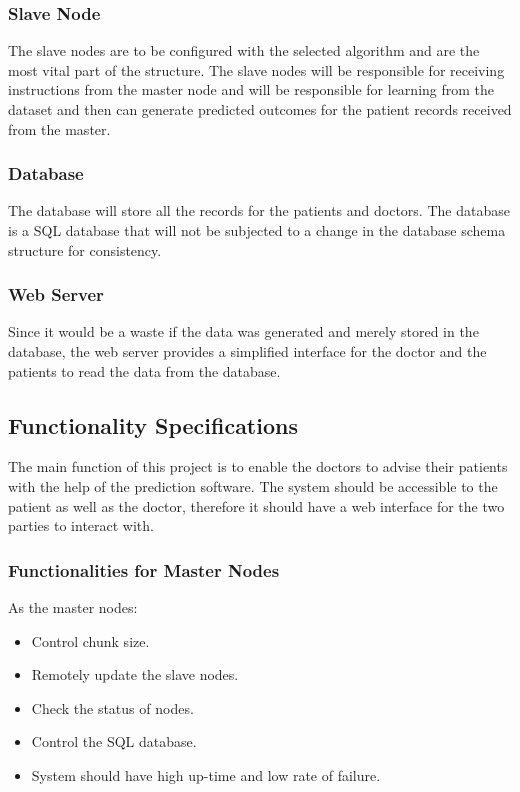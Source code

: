 \documentclass[12pt]{article}
\begin{document}
\subsubsection{Slave Node}
The slave nodes are to be configured with the selected algorithm and are the most vital part of the structure. The slave nodes will be responsible for receiving instructions from the master node and will be responsible for learning from the dataset and then can generate predicted outcomes for the patient records received from the master. 

\subsubsection{Database}
The database will store all the records for the patients and doctors. The database is a SQL database that will not be subjected to a change in the database schema structure for consistency.

\subsubsection{Web Server}
Since it would be a waste if the data was generated and merely stored in the database, the web server provides a simplified interface for the doctor and the patients to read the data from the database.

\clearpage
\newpage
\subsection{Functionality Specifications}
The main function of this project is to enable the doctors to advise their patients with the help of the prediction software. The system should be accessible to the patient as well as the doctor, therefore it should have a web interface for the two parties to interact with.

\subsubsection{Functionalities for Master Nodes}
As the master nodes:
\begin{itemize}
\item Control chunk size.
\item Remotely update the slave nodes.
\item Check the status of nodes.
\item Control the SQL database.
\item System should have high up-time and low rate of failure.
\end{itemize}
\end{document}
